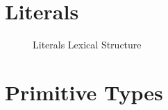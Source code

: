 \section{Literals}\label{sec:literals}

\begin{figure}
\verbatimfont{\small}
\begin{framed}

\end{framed}
\caption{Literals Lexical Structure}
\label{fig:literals-syntax}
\end{figure}

\section{Primitive Types}\label{sec:primitive-types}
